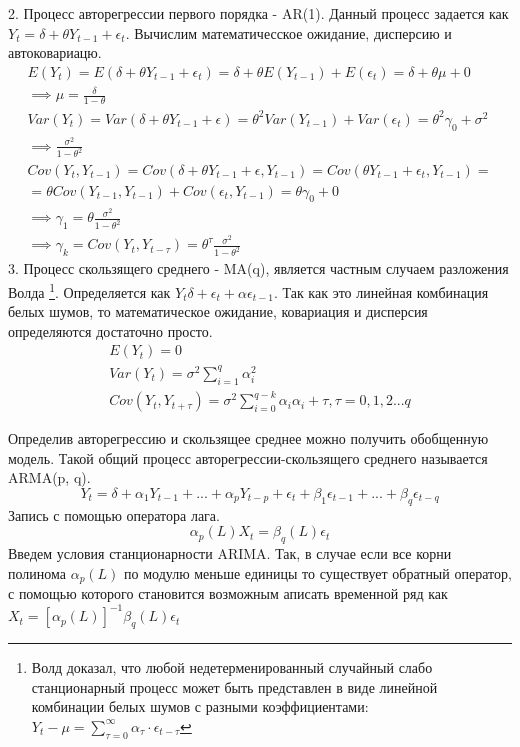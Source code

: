 \documentclass[12pt, a4paper]{article} %
\begin{document}
2. Процесс авторегрессии первого порядка - AR(1). Данный процесс задается как $Y_t = \delta + \theta Y_{t-1} + \epsilon_t$. Вычислим математичесское ожидание, дисперсию и автоковариацю.
\begin{equation}
    \begin{aligned}
        E(Y_t)= E(\delta + \theta Y_{t-1}+\epsilon_t) = \delta + \theta E(Y_{t-1})+E(\epsilon_t)=\delta+\theta\mu + 0 \\
        \implies \mu=\frac{\delta}{1-\theta} \\
        Var(Y_t) = Var(\delta + \theta Y_{t-1}+\epsilon) = \theta^2 Var(Y_{t-1})+Var(\epsilon_t) = \theta^2\gamma_0+\sigma^2 \\
        \implies \frac{\sigma^2}{1 - \theta^2} \\
        Cov(Y_t, Y_{t-1})= Cov(\delta + \theta Y_{t-1}+\epsilon, Y_{t-1}) =
        Cov(\theta Y_{t-1} + \epsilon_t, Y_{t-1}) = \\
        = \theta Cov(Y_{t-1}, Y_{t-1}) + Cov(\epsilon_t, Y_{t-1}) = \theta\gamma_0 + 0 \\
        \implies \gamma_1 = \theta\frac{\sigma^2}{1-\theta^2} \\
        \implies \gamma_k = Cov(Y_t, Y_{t-\tau})=\theta^\tau \frac{\sigma^2}{1-\theta^2}
    \end{aligned}
\end{equation}
3. Процесс скользящего среднего - MA(q), является частным случаем разложения Волда 
\footnote{Волд доказал, что любой недетерменированный случайный слабо станционарный процесс может быть представлен в виде линейной комбинации белых шумов с разными коэффициентами: $Y_t-\mu = \sum_{\tau=0}^\infty \alpha_{\tau}\cdot\epsilon_{t-\tau}$}.
Определяется как $Y_t \delta + \epsilon_t + \alpha\epsilon_{t-1}$. Так как это линейная комбинация белых шумов, то математическое ожидание, ковариация и дисперсия определяются достаточно просто.
\begin{equation}
    \begin{aligned}
        E(Y_t)=0 \\
        Var(Y_t)=\sigma^2 \sum^q_{i=1} \alpha^2_i \\
        Cov(Y_t, Y_{t+\tau})=\sigma^2 \sum^{q-k}_{i=0}\alpha_i \alpha_i+\tau, \tau=0,1,2...q
    \end{aligned}
\end{equation}

Определив авторегрессию и скользящее среднее можно получить обобщенную модель. Такой общий процесс авторегрессии-скользящего среднего называется ARMA(p, q).
\begin{equation}
    Y_t = \delta + \alpha_1 Y_{t-1} + ... + \alpha_p Y_{t-p} + \epsilon_t + \beta_1\epsilon_{t-1} + ... + \beta_q\epsilon_{t-q}
\end{equation}
Запись с помощью оператора лага.
\begin{equation}
    \alpha_p(L)X_t=\beta_q(L)\epsilon_t
\end{equation}
Введем условия станционарности ARIMA. Так, в случае если все корни полинома $\alpha_p(L)$ по модулю меньше единицы то существует обратный оператор, с помощью которого становится возможным аписать временной ряд как $X_t = \left[\alpha_p(L)\right]^{-1}\beta_q(L)\epsilon_t$
\end{document}
